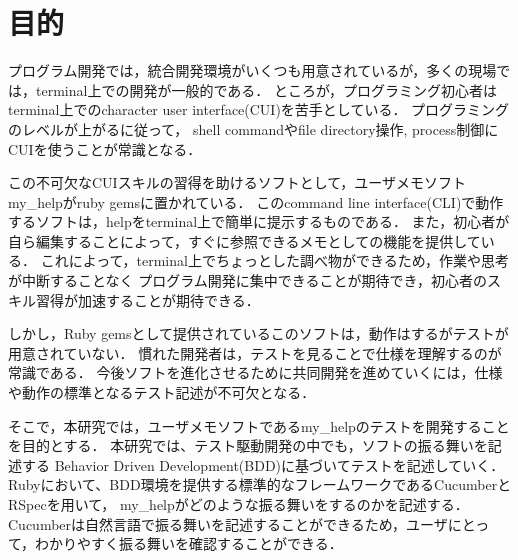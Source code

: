 \section{目的}
プログラム開発では，統合開発環境がいくつも用意されているが，多くの現場では，terminal上での開発が一般的である．
ところが，プログラミング初心者はterminal上でのcharacter user interface(CUI)を苦手としている．
プログラミングのレベルが上がるに従って，
shell commandやfile directory操作, process制御にCUIを使うことが常識となる．

この不可欠なCUIスキルの習得を助けるソフトとして，ユーザメモソフトmy\_helpがruby gemsに置かれている．
このcommand line interface(CLI)で動作するソフトは，helpをterminal上で簡単に提示するものである．
また，初心者が自ら編集することによって，すぐに参照できるメモとしての機能を提供している．
これによって，terminal上でちょっとした調べ物ができるため，作業や思考が中断することなく
プログラム開発に集中できることが期待でき，初心者のスキル習得が加速することが期待できる．

しかし，Ruby gemsとして提供されているこのソフトは，動作はするがテストが用意されていない．
慣れた開発者は，テストを見ることで仕様を理解するのが常識である．
今後ソフトを進化させるために共同開発を進めていくには，仕様や動作の標準となるテスト記述が不可欠となる．

そこで，本研究では，ユーザメモソフトであるmy\_helpのテストを開発することを目的とする．
本研究では、テスト駆動開発の中でも，ソフトの振る舞いを記述する
Behavior Driven Development(BDD)に基づいてテストを記述していく．
Rubyにおいて、BDD環境を提供する標準的なフレームワークであるCucumberとRSpecを用いて，
my\_helpがどのような振る舞いをするのかを記述する．
Cucumberは自然言語で振る舞いを記述することができるため，ユーザにとって，わかりやすく振る舞いを確認することができる．


